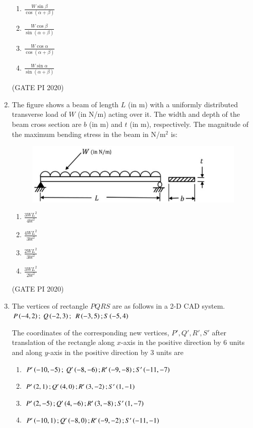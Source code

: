 \documentclass[journal,12pt,onecolumn]{IEEEtran}
\theoremstyle{remark}
\begin{document}
\begin{enumerate}
\begin{enumerate}
\item $\frac{W \sin \beta}{\cos(\alpha + \beta)}$
\item $\frac{W \cos \beta}{\sin(\alpha + \beta)}$
\item $\frac{W \cos \alpha}{\cos(\alpha + \beta)}$
\item $\frac{W \sin \alpha}{\sin(\alpha + \beta)}$
\end{enumerate}

\hfill (GATE PI 2020)

\item The figure shows a beam of length $L$ (in m) with a uniformly distributed transverse load of $W$ (in N/m) acting over it. The width and depth of the beam cross section are $b$ (in m) and $t$ (in m), respectively. The magnitude of the maximum bending stress in the beam in N/m$^2$ is:

\begin{figure}[h]
    \centering
    \includegraphics[width=0.5\columnwidth]{figs/fig12.png}
    \caption{}
    \label{fig:placeholder}
\end{figure}

\begin{enumerate}
    \item $\frac{3WL^2}{4bt^2}$
    \item $\frac{4WL^2}{3bt^2}$
    \item $\frac{2WL^2}{3bt^2}$
    \item $\frac{3WL^2}{2b t^2}$
\end{enumerate}


\hfill (GATE PI 2020)

\item The vertices of rectangle $PQRS$ are as follows in a 2-D CAD system.
$P\left(-4,2\right);\ Q\left(-2,3\right); $
$ R\left(-3,5\right);S\left(-5,4\right)$

The coordinates of the corresponding new vertices, $P', Q', R', S'$ after translation of the rectangle along $x$-axis in the positive direction by $6$ units and along $y$-axis in the positive direction by $3$ units are

\begin{enumerate}
  \item $P'\left(-10,-5\right);\ Q'\left(-8,-6\right); R'\left(-9,-8\right); S'\left(-11,-7\right)$
    \item $P'\left(2,1\right); Q'\left(4,0\right); R'\left(3,-2\right); S'\left(1,-1\right)$
    \item $P'\left(2,-5\right); Q'\left(4,-6\right); R'\left(3,-8\right); S'\left(1,-7\right)$
    \item $P'\left(-10,1\right); Q'\left(-8,0\right); R'\left(-9,-2\right); S'\left(-11,-1\right)$
\end{enumerate}


\end{enumerate}
\end{document}
